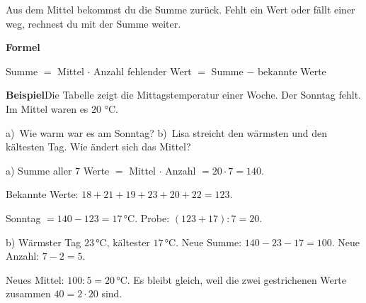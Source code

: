 \documentclass[11pt]{article}
\begin{document}
\noindent Aus dem Mittel bekommst du die Summe zurück. Fehlt ein Wert oder fällt einer weg, rechnest du mit der Summe weiter.\par\medskip
\noindent\textbf{Formel}\par\nopagebreak\noindent\hspace*{4mm}\begin{minipage}{\dimexpr\linewidth-4mm\relax}Summe $=$ Mittel $\cdot$ Anzahl \qquad fehlender Wert $=$ Summe $-$ bekannte Werte\end{minipage}\par\medskip
\noindent\textbf{Beispiel}\quad Die Tabelle zeigt die Mittagstemperatur einer Woche. Der Sonntag fehlt. Im Mittel waren es $20$ °C.\par\vspace{3pt} \par\vspace{3pt} a)~Wie warm war es am Sonntag? b)~Lisa streicht den wärmsten und den kältesten Tag. Wie ändert sich das Mittel?\par\smallskip
\noindent\par\noindent{}a) Summe aller $7$ Werte $=$ Mittel $\cdot$ Anzahl $= 20 \cdot 7 = 140$.\par\smallskip\par\noindent{}Bekannte Werte: $18 + 21 + 19 + 23 + 20 + 22 = 123$.\par\smallskip\par\noindent{}Sonntag $= 140 - 123 = 17$\,°C. Probe: $(123 + 17) : 7 = 20$.\par\smallskip\par\noindent{}b) Wärmster Tag $23$\,°C, kältester $17$\,°C. Neue Summe: $140 - 23 - 17 = 100$. Neue Anzahl: $7 - 2 = 5$.\par\smallskip\par\noindent{}Neues Mittel: $100 : 5 = 20$\,°C. Es bleibt gleich, weil die zwei gestrichenen Werte zusammen $40 = 2 \cdot 20$ sind.\par\smallskip\par\medskip
\end{document}
